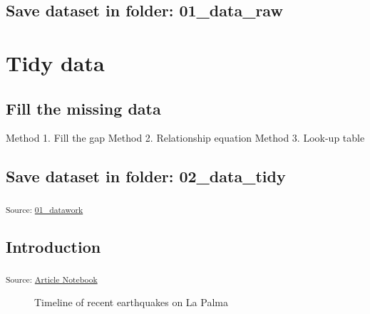 \documentclass[
]{agujournal2019}
\begin{document}
\subsection{Save dataset in folder:
01\_data\_raw}\label{save-dataset-in-folder-01_data_raw}

\section{Tidy data}\label{tidy-data}

\subsection{Fill the missing data}\label{fill-the-missing-data}

Method 1. Fill the gap Method 2. Relationship equation Method 3. Look-up
table

\subsection{Save dataset in folder:
02\_data\_tidy}\label{save-dataset-in-folder-02_data_tidy}

\textsubscript{Source:
\href{https://EmouAcademy.github.io/my-awesome-manuscripts/notebooks/01_datawork-preview.html\#f35a84c0-423e-4e48-bb71-ee0c707df98c}{01\_datawork}}

\subsection{Introduction}\label{introduction}

\textsubscript{Source:
\href{https://EmouAcademy.github.io/my-awesome-manuscripts/index.qmd.html}{Article
Notebook}}

\label{cell-fig-timeline}
\begin{figure}[H]


\caption{\label{fig-timeline}Timeline of recent earthquakes on La Palma}

\end{figure}%
\end{document}
